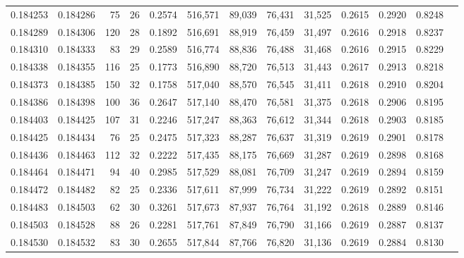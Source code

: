 \begin{tabular}{rrrrrrrrrrrrr}
0.184253 & 0.184286 &    75 &  26 &                                     0.2574 & 516,571 &  89,039 &  76,431 &  31,525 & 0.2615 & 0.2920 & 0.8248 \\
0.184289 & 0.184306 &   120 &  28 &                                     0.1892 & 516,691 &  88,919 &  76,459 &  31,497 & 0.2616 & 0.2918 & 0.8237 \\
0.184310 & 0.184333 &    83 &  29 &                                     0.2589 & 516,774 &  88,836 &  76,488 &  31,468 & 0.2616 & 0.2915 & 0.8229 \\
0.184338 & 0.184355 &   116 &  25 &                                     0.1773 & 516,890 &  88,720 &  76,513 &  31,443 & 0.2617 & 0.2913 & 0.8218 \\
0.184373 & 0.184385 &   150 &  32 &                                     0.1758 & 517,040 &  88,570 &  76,545 &  31,411 & 0.2618 & 0.2910 & 0.8204 \\
0.184386 & 0.184398 &   100 &  36 &                                     0.2647 & 517,140 &  88,470 &  76,581 &  31,375 & 0.2618 & 0.2906 & 0.8195 \\
0.184403 & 0.184425 &   107 &  31 &                                     0.2246 & 517,247 &  88,363 &  76,612 &  31,344 & 0.2618 & 0.2903 & 0.8185 \\
0.184425 & 0.184434 &    76 &  25 &                                     0.2475 & 517,323 &  88,287 &  76,637 &  31,319 & 0.2619 & 0.2901 & 0.8178 \\
0.184436 & 0.184463 &   112 &  32 &                                     0.2222 & 517,435 &  88,175 &  76,669 &  31,287 & 0.2619 & 0.2898 & 0.8168 \\
0.184464 & 0.184471 &    94 &  40 &                                     0.2985 & 517,529 &  88,081 &  76,709 &  31,247 & 0.2619 & 0.2894 & 0.8159 \\
0.184472 & 0.184482 &    82 &  25 &                                     0.2336 & 517,611 &  87,999 &  76,734 &  31,222 & 0.2619 & 0.2892 & 0.8151 \\
0.184483 & 0.184503 &    62 &  30 &                                     0.3261 & 517,673 &  87,937 &  76,764 &  31,192 & 0.2618 & 0.2889 & 0.8146 \\
0.184503 & 0.184528 &    88 &  26 &                                     0.2281 & 517,761 &  87,849 &  76,790 &  31,166 & 0.2619 & 0.2887 & 0.8137 \\
0.184530 & 0.184532 &    83 &  30 &                                     0.2655 & 517,844 &  87,766 &  76,820 &  31,136 & 0.2619 & 0.2884 & 0.8130 \\

\end{tabular}
